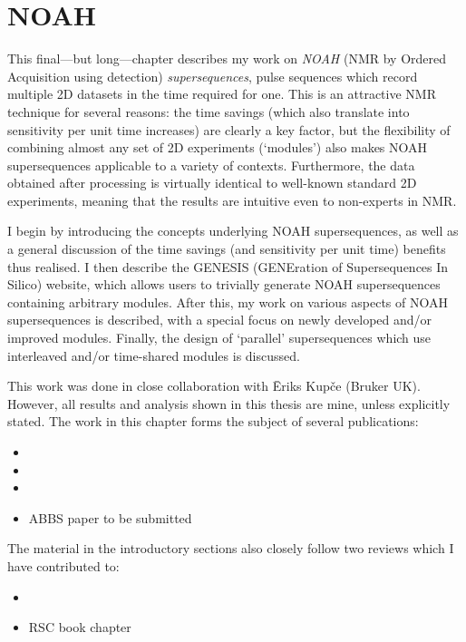\chapter{NOAH}
\label{chpt:noah}

This final---but long---chapter describes my work on \textit{NOAH} (NMR by Ordered Acquisition using \proton{} detection) \textit{supersequences}, pulse sequences which record multiple 2D datasets in the time required for one.\autocite{Kupce2017ACIE}
This is an attractive NMR technique for several reasons: the time savings (which also translate into sensitivity per unit time increases) are clearly a key factor, but the flexibility of combining almost any set of 2D experiments (`modules') also makes NOAH supersequences applicable to a variety of contexts.
Furthermore, the data obtained after processing is virtually identical to well-known standard 2D experiments, meaning that the results are intuitive even to non-experts in NMR.

I begin by introducing the concepts underlying NOAH supersequences, as well as a general discussion of the time savings (and sensitivity per unit time) benefits thus realised.
I then describe the GENESIS (GENEration of Supersequences In Silico) website, which allows users to trivially generate NOAH supersequences containing arbitrary modules.
After this, my work on various aspects of NOAH supersequences is described, with a special focus on newly developed and/or improved modules.
Finally, the design of `parallel' supersequences which use interleaved and/or time-shared modules is discussed.

This work was done in close collaboration with {\=E}riks Kup{\v{c}}e (Bruker UK).
However, all results and analysis shown in this thesis are mine, unless explicitly stated.
The work in this chapter forms the subject of several publications:

\begin{itemize}
    \item {}
    \item {}
    \item {}
    \item ABBS paper to be submitted
\end{itemize}

The material in the introductory sections also closely follow two reviews which I have contributed to:
\begin{itemize}
    \item {}
    \item RSC book chapter
\end{itemize}









\printbibliography[heading=subbibnumbered]{}
